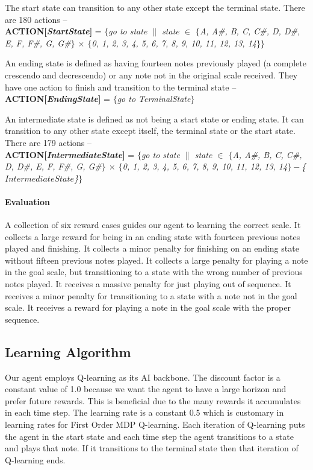 \documentclass{chi2009}
\begin{document}
The start state can transition to any other state except the terminal state. There are 180 actions -- \\
\textbf{ACTION[\textit{StartState}]} = \textit{$\{$go to state $\|$ state $\in$ $\{$A, A\#, B, C, C\#, D, D\#, E, F, F\#, G, G\#$\}$ $\times$ $\{$0, 1, 2, 3, 4, 5, 6, 7, 8, 9, 10, 11, 12, 13, 14$\} \}$}


An ending state is defined as having fourteen notes previously played (a complete crescendo and decrescendo) or any note not in the original scale received. They have one action to finish and transition to the terminal state -- \\ 
\textbf{ACTION[\textit{EndingState}]} = \textit{$\{$go to TerminalState$\}$}


An intermediate state is defined as not being a start state or ending state. It can transition to any other state except itself, the terminal state or the start state. There are 179 actions -- \\ 
\textbf{ACTION[\textit{IntermediateState}]} = \textit{$\{$go to state $\|$ state $\in$ $\{$A, A\#, B, C, C\#, D, D\#, E, F, F\#, G, G\#$\}$ $\times$ $\{$0, 1, 2, 3, 4, 5, 6, 7, 8, 9, 10, 11, 12, 13, 14$\} - $\{$IntermediateState$\}$\}$}



\paragraph{Evaluation}
A collection of six reward cases guides our agent to learning the correct scale. It collects a large reward for being in an ending state with fourteen previous notes played and finishing. It collects a minor penalty for finishing on an ending state without fifteen previous notes played. It collects a large penalty for playing a note in the goal scale, but transitioning to a state with the wrong number of previous notes played. It receives a massive penalty for just playing out of sequence. It receives a minor penalty for transitioning to a state with a note not in the goal scale. It receives a reward for playing a note in the goal scale with the proper sequence.

\subsection{Learning Algorithm}
Our agent employs Q-learning as its AI backbone. The discount factor is a constant value of 1.0 because we want the agent to have a large horizon and prefer future rewards. This is beneficial due to the many rewards it accumulates in each time step. The learning rate is a constant 0.5 which is customary in learning rates for First Order MDP Q-learning. Each iteration of Q-learning puts the agent in the start state and each time step the agent transitions to a state and plays that note. If it transitions to the terminal state then that iteration of Q-learning ends.
\end{document}

